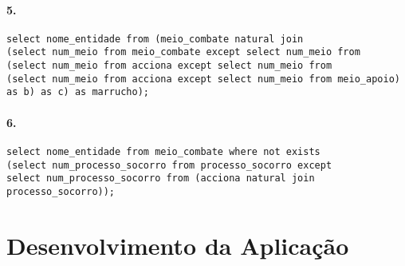 \documentclass[10pt,a4paper]{article}
\begin{document}
\paragraph{5.}
\begin{verbatim}
select nome_entidade from (meio_combate natural join 
(select num_meio from meio_combate except select num_meio from  
(select num_meio from acciona except select num_meio from 
(select num_meio from acciona except select num_meio from meio_apoio) as b) as c) as marrucho);
\end{verbatim}

\paragraph{6.}
\begin{verbatim}
select nome_entidade from meio_combate where not exists 
(select num_processo_socorro from processo_socorro except 
select num_processo_socorro from (acciona natural join processo_socorro));
\end{verbatim}

\section{Desenvolvimento da Aplicação}
\end{document}
